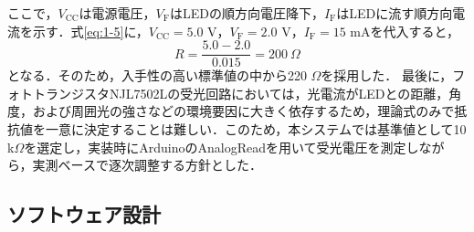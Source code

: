 \documentclass[uplatex,dvipdfmx]{jlreq}
\begin{document}
ここで，$V_{\mathrm{CC}}$は電源電圧，$V_{\mathrm{F}}$はLEDの順方向電圧降下，$I_{\mathrm{F}}$はLEDに流す順方向電流を示す．式\ref{eq:1-5}に，$V_{\mathrm{CC}} = 5.0$ V，$V_{\mathrm{F}} = 2.0$ V，$I_{\mathrm{F}} = 15$ mAを代入すると，
\begin{equation}
    R = \frac{5.0 - 2.0}{0.015} = 200 \ \Omega
    \label{eq:1-6}
\end{equation}
となる．そのため，入手性の高い標準値の中から220 $\Omega$を採用した．
最後に，フォトトランジスタNJL7502Lの受光回路においては，光電流がLEDとの距離，角度，および周囲光の強さなどの環境要因に大きく依存するため，理論式のみで抵抗値を一意に決定することは難しい．このため，本システムでは基準値として10 k$\Omega$を選定し，実装時にArduinoのAnalogReadを用いて受光電圧を測定しながら，実測ベースで逐次調整する方針とした．
\fi

\subsection{ソフトウェア設計}
\end{document}
